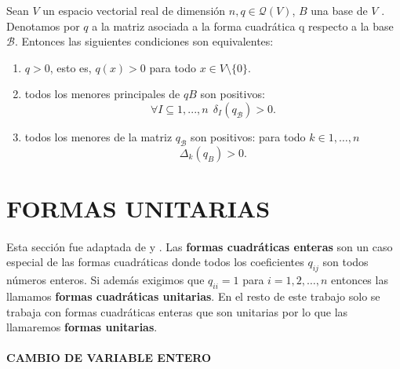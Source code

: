 \begin{theorem}
Sean $V$ un espacio vectorial real de dimensión $n, q \in \mathcal{Q}(V)$, $B$ una base de $V$ . Denotamos por $q$ a la matriz asociada a la forma cuadrática q respecto a la base $\mathcal{B}$. Entonces las siguientes condiciones son equivalentes:
\begin{enumerate}
\item $q > 0$, esto es, $q(x) > 0$ para todo $x \in V \setminus \{0\}$.
\item todos los menores principales de $qB$ son positivos:
\begin{equation*}
\forall I \subseteq {1, . . . , n} ~~ \delta_{I}(q_{\mathcal{B}}) > 0.
\end{equation*}
\item todos los menores de la matriz $q_{\mathcal{B}}$ son positivos: para todo $k \in {1, \ldots, n}$
\begin{equation*}
\Delta_{k}(q_{B}) > 0.
\end{equation*}
\end{enumerate}
\label{teorema:1.6}
\end{theorem}

\section{FORMAS UNITARIAS}
\paragraph*{}
Esta sección fue adaptada de \citep{Ringel1985TameAA} y \citep{alma991031505829703276}. Las \textbf{formas cuadráticas enteras} son un caso especial de las formas cuadráticas donde todos los coeficientes $q_{ij}$ son todos números enteros. Si además exigimos que $q_{ii} = 1$ para $i = 1, 2, \ldots, n$ entonces las llamamos \textbf{formas cuadráticas unitarias}. En el resto de este trabajo solo se trabaja con formas cuadráticas enteras que son unitarias por lo que  las llamaremos \textbf{formas unitarias}.

\paragraph*{}
\textbf{CAMBIO DE VARIABLE ENTERO}

